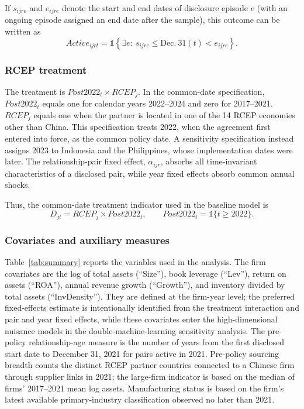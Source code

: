 \documentclass[preprint,12pt,authoryear]{elsarticle}
\begin{document}
If $s_{ijre}$ and $e_{ijre}$ denote the start and end dates of disclosure episode
$e$ (with an ongoing episode assigned an end date after the sample), this outcome
can be written as
\begin{equation}
\label{eq:active}
Active_{ijrt}
=\mathbb{1}\!\left\{\exists e:\ s_{ijre}\leq \mathrm{Dec.\ 31}(t)<e_{ijre}\right\}.
\end{equation}

\subsubsection{RCEP treatment}

The treatment is $Post2022_t\times RCEP_j$. In the common-date specification, $Post2022_t$ equals one for calendar years 2022--2024 and zero for 2017--2021. $RCEP_j$ equals one when the partner is located in one of the 14 RCEP economies other than China. This specification treats 2022, when the agreement first entered into force, as the common policy date. A sensitivity specification instead assigns 2023 to Indonesia and the Philippines, whose implementation dates were later. The relationship-pair fixed effect, $\alpha_{ijr}$, absorbs all time-invariant characteristics of a disclosed pair, while year fixed effects absorb common annual shocks.

Thus, the common-date treatment indicator used in the baseline model is
\begin{equation}
\label{eq:treatment}
D_{jt}=RCEP_j\times Post2022_t,\qquad
Post2022_t=\mathbb{1}\{t\geq 2022\}.
\end{equation}

\subsubsection{Covariates and auxiliary measures}

Table~\ref{tab:summary} reports the variables used in the analysis. The firm covariates are the log of total assets (``Size''), book leverage (``Lev''), return on assets (``ROA''), annual revenue growth (``Growth''), and inventory divided by total assets (``InvDensity''). They are defined at the firm-year level; the preferred fixed-effects estimate is intentionally identified from the treatment interaction and pair and year fixed effects, while these covariates enter the high-dimensional nuisance models in the double-machine-learning sensitivity analysis. The pre-policy relationship-age measure is the number of years from the first disclosed start date to December 31, 2021 for pairs active in 2021. Pre-policy sourcing breadth counts the distinct RCEP partner countries connected to a Chinese firm through supplier links in 2021; the large-firm indicator is based on the median of firms' 2017--2021 mean log assets. Manufacturing status is based on the firm's latest available primary-industry classification observed no later than 2021.
\end{document}
